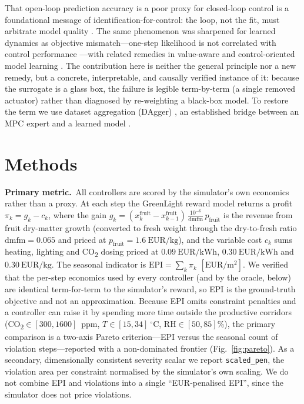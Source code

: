 \documentclass[preprint,3p]{elsarticle}
\begin{document}
That open-loop prediction accuracy is a poor proxy for closed-loop control is a
foundational message of identification-for-control: the loop, not the fit, must
arbitrate model quality \citep{gevers1993,hjalmarsson1994closing,%
vandenhof1995closedloop,hjalmarsson2005experiment}. The same phenomenon was sharpened
for learned dynamics as objective mismatch---one-step likelihood is not correlated
with control performance \citep{lambert2020objective,wei2023unified}---with related
remedies in value-aware and control-oriented model learning
\citep{farahmand2017value,controlorientedsurvey2025}. The contribution here is neither
the general principle nor a new remedy, but a concrete, interpretable, and causally
verified instance of it: because the surrogate is a glass box, the failure is legible
term-by-term (a single removed actuator) rather than diagnosed by re-weighting a
black-box model. To restore the term we use dataset aggregation (DAgger)
\citep{ross2011dagger}, an established bridge between an MPC expert and a learned model
\citep{sun2017deeply,tagliabue2021guided,espin2024deepmpc}.

\section{Methods}
\label{sec:methods}

\textbf{Primary metric.}~All controllers are scored by the simulator's own economics
rather than a proxy. At each step the GreenLight reward model returns a profit
$\pi_k = g_k - c_k$, where the gain $g_k = (x^{\mathrm{fruit}}_k -
x^{\mathrm{fruit}}_{k-1})\,\tfrac{10^{-6}}{\mathrm{dmfm}}\,p_{\mathrm{fruit}}$ is the
revenue from fruit dry-matter growth (converted to fresh weight through the
dry-to-fresh ratio $\mathrm{dmfm}=0.065$ and priced at
$p_{\mathrm{fruit}}=1.6~\mathrm{EUR/kg}$), and the variable cost $c_k$ sums heating,
lighting and CO\textsubscript{2} dosing priced at $0.09~\mathrm{EUR/kWh}$,
$0.30~\mathrm{EUR/kWh}$ and $0.30~\mathrm{EUR/kg}$. The seasonal indicator is
$\mathrm{EPI}=\sum_k \pi_k$ $[\mathrm{EUR/m^2}]$. We verified that the per-step
economics used by every controller (and by the oracle, below) are identical
term-for-term to the simulator's reward, so EPI is the ground-truth objective and not
an approximation. Because EPI omits constraint penalties and a controller can raise it
by spending more time outside the productive corridors
(CO\textsubscript{2}$\in[300,1600]$~ppm, $T\in[15,34]~^\circ$C, RH$\in[50,85]\%$), the
primary comparison is a two-axis Pareto criterion---EPI versus the seasonal count of
violation steps---reported with a non-dominated frontier (Fig.~\ref{fig:pareto}). As a
secondary, dimensionally consistent severity scalar we report \texttt{scaled\_pen},
the violation area per constraint normalised by the simulator's own scaling. We do not
combine EPI and violations into a single ``EUR-penalised EPI'', since the simulator
does not price violations.
\end{document}
